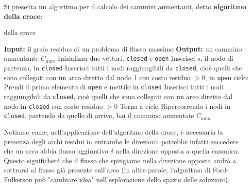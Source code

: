 \documentclass[a4paper,11pt]{article}
\begin{document}
Si presenta un algoritmo per il calcolo dei cammini aumentanti, detto \textbf{algoritmo della croce}:
\begin{algorithm}[H]
\caption{della croce}
\begin{algorithmic}
	\STATE \textbf{Input:} il grafo residuo di un problema di flusso massimo %
	\STATE \textbf{Output:} un cammino aumentante $C_{aum}$ %
	\STATE Inizializza due vettori, \lstinline|closed| e \lstinline|open|
	\STATE Inserisci $s$, il nodo di partenza, in \lstinline|closed|
	\STATE Inserisci tutti i nodi raggiungibili da \lstinline|closed|, cioè quelli che sono collegati con un arco diretto dal nodo 1 con costo residuo $> 0$, in \lstinline|open|
	\STATE \textsf{ciclo:}
	\STATE Prendi il primo elemento di \lstinline|open| e mettilo in \lstinline|closed|
	\STATE Inserisci tutti i nodi raggiungibili da \lstinline|closed|, cioè quelli che sono collegati con un arco diretto dal nodo in \lstinline|closed| con costo residuo $> 0$
		\STATE Torna a \textsf{ciclo}
	\ENDIF
	\STATE Ripercorrendo i nodi in \lstinline|closed|, partendo da quello di arrivo, hai il cammino aumentate $C_{aum}$
\end{algorithmic}
\end{algorithm}

Notiamo come, nell'applicazione dell'algoritmo della croce, è necessaria la presenza degli archi residui in entrambe le direzioni: potrebbe infatti succedere che un arco abbia flusso aggiuntivo $\delta$ nella direzione opposta a quella canonica.
Questo significherà che il flusso che spingiamo nella direzione opposta andrà a sottrarsi al flusso già presente sull'arco (in altre parole, l'algoritmo di Ford-Fulkerson può "cambiare idea" nell'esplorazione dello spazio delle soluzioni).
\end{document}
